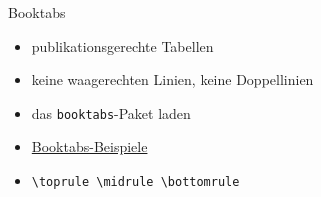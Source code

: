 \begin{frame}[fragile]{Booktabs}

\begin{itemize}[<+->]
    \item publikationsgerechte Tabellen
    \item keine waagerechten Linien, keine Doppellinien
    \item das \texttt{booktabs}-Paket laden
    \item \href{ftp://ftp.rrzn.uni-hannover.de/pub/mirror/tex-archive/macros/latex/contrib/booktabs-de/booktabs-de.pdf}{Booktabs-Beispiele}
    \item \lstinline|\toprule \midrule \bottomrule|
\end{itemize}

\end{frame}